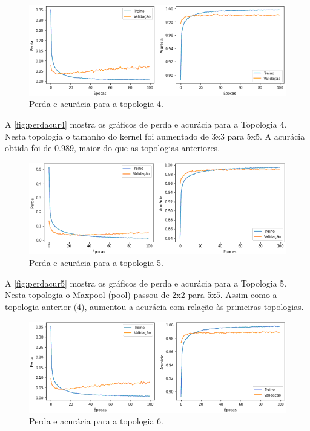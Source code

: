 \documentclass[sigconf, nonacm, screen]{acmart}
\begin{document}
\begin{figure}[ht]
	\centering
	\includegraphics[width=\linewidth]{img/perd_acur_4}
	\caption{Perda e acurácia para a topologia 4.}
	\label{fig:perdacur4}
\end{figure}

A \autoref{fig:perdacur4} mostra os gráficos de perda e acurácia para a Topologia 4. Nesta topologia o tamanho do kernel foi aumentado de 3x3 para 5x5. A acurácia obtida foi de 0.989, maior do que as topologias anteriores.

\begin{figure}[ht]
	\centering
	\includegraphics[width=\linewidth]{img/perd_acur_5}
	\caption{Perda e acurácia para a topologia 5.}
	\label{fig:perdacur5}
\end{figure}

A \autoref{fig:perdacur5} mostra os gráficos de perda e acurácia para a Topologia 5. Nesta topologia o Maxpool (pool) passou de 2x2 para 5x5. Assim como a topologia anterior (4), aumentou a acurácia com relação às primeiras topologias.

\begin{figure}[ht]
	\centering
	\includegraphics[width=\linewidth]{img/perd_acur_6}
	\caption{Perda e acurácia para a topologia 6.}
	\label{fig:topo6}
\end{figure}
\end{document}
